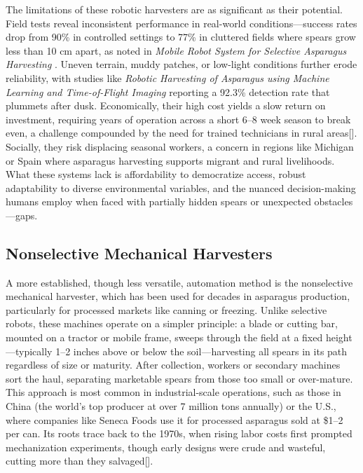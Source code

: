 The limitations of these robotic harvesters are as significant as their potential. Field tests reveal inconsistent performance in real-world conditions—success rates drop from 90\% in controlled settings to 77\% in cluttered fields where spears grow less than 10 cm apart, as noted in \textit{Mobile Robot System for Selective Asparagus Harvesting} \cite{mdpi2023mobile}. Uneven terrain, muddy patches, or low-light conditions further erode reliability, with studies like \textit{Robotic Harvesting of Asparagus using Machine Learning and Time-of-Flight Imaging} \cite{peebles2022robotic} reporting a 92.3\% detection rate that plummets after dusk. Economically, their high cost yields a slow return on investment, requiring years of operation across a short 6--8 week season to break even, a challenge compounded by the need for trained technicians in rural areas[\cite{waea2004simulation}]. Socially, they risk displacing seasonal workers, a concern in regions like Michigan or Spain where asparagus harvesting supports migrant and rural livelihoods. What these systems lack is affordability to democratize access, robust adaptability to diverse environmental variables, and the nuanced decision-making humans employ when faced with partially hidden spears or unexpected obstacles—gaps.

\subsection{Nonselective Mechanical Harvesters}
A more established, though less versatile, automation method is the nonselective mechanical harvester, which has been used for decades in asparagus production, particularly for processed markets like canning or freezing. Unlike selective robots, these machines operate on a simpler principle: a blade or cutting bar, mounted on a tractor or mobile frame, sweeps through the field at a fixed height—typically 1--2 inches above or below the soil—harvesting all spears in its path regardless of size or maturity. After collection, workers or secondary machines sort the haul, separating marketable spears from those too small or over-mature. This approach is most common in industrial-scale operations, such as those in China (the world’s top producer at over 7 million tons annually) or the U.S., where companies like Seneca Foods use it for processed asparagus sold at \$1--2 per can. Its roots trace back to the 1970s, when rising labor costs first prompted mechanization experiments, though early designs were crude and wasteful, cutting more than they salvaged[\cite{usda2022labor}].

